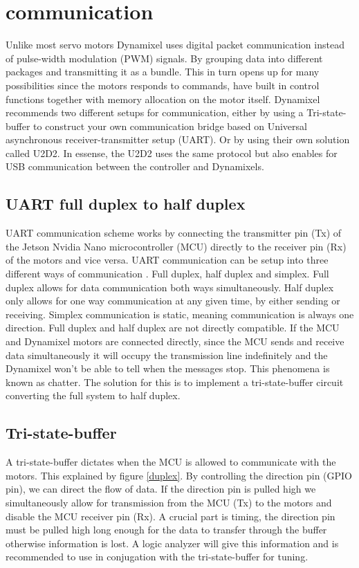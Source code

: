 \section*{communication}
Unlike most servo motors Dynamixel uses digital packet communication instead of pulse-width modulation (PWM) signals.
By grouping data into different packages and transmitting it as a bundle.
This in turn opens up for many possibilities since the motors responds to commands,
have built in control functions together with memory allocation on the motor itself.
Dynamixel recommends two different setups for communication,
either by using a Tri-state-buffer to construct your own communication bridge  based on Universal asynchronous receiver-transmitter setup (UART). Or by using their own solution called U2D2.
In essense, the U2D2 uses the same protocol but also enables for USB communication between the controller and Dynamixels\cite{robotis}.

\subsection{UART full duplex to half duplex}
UART communication scheme works by connecting the transmitter pin (Tx) of the Jetson Nvidia Nano microcontroller (MCU)
directly to the receiver pin (Rx) of the motors and vice versa.
UART communication can be setup into three different ways of communication \cite{duplex}.
Full duplex, half duplex and simplex.
Full duplex allows for data communication both ways simultaneously.
Half duplex only allows for one way communication at any given time, by either sending or receiving.
Simplex communication is static, meaning communication is always one direction.
\newline
Full duplex and half duplex are not directly compatible. 
If the MCU and Dynamixel motors are connected directly,
since the MCU sends and receive data simultaneously it will occupy the transmission line indefinitely and the Dynamixel won't be able to tell when the messages stop. 
This phenomena is known as chatter. 
The solution for this is to implement a tri-state-buffer circuit converting the full system to half duplex.

\subsection{Tri-state-buffer}

A tri-state-buffer dictates when the MCU is allowed to communicate with the motors. This explained  by figure \ref{duplex}.
By controlling the direction pin (GPIO pin),
we can direct the flow of data. 
If the direction pin is pulled high we simultaneously allow for transmission from the MCU (Tx) to the motors and disable the MCU receiver pin (Rx).
A crucial part is timing, the direction pin must be pulled high long enough for the data to transfer through the buffer otherwise information is lost.
A logic analyzer will give this information and is recommended to use in conjugation with the tri-state-buffer for tuning.


